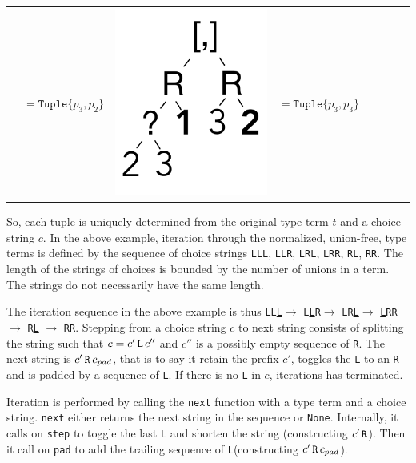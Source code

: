 \documentclass[a4paper,english]{lipics-v2019}
\newcommand{\xt}[1]{\texttt{#1}}
\renewcommand{\L}{{\tt L}\xspace}
\newcommand{\R}{{\tt R}\xspace}
\newcommand{\uL}{{\underline{\tt L}}\xspace}
\renewcommand{\c}[1]{\lstinline{#1}\xspace}
\newcommand{\tuple}[1]{\xt{Tuple\{}#1\xt{\}}}
\begin{document}
{\begin{tabular}{@{}l@{~}ll@{~}ll@{~}ll@{~}l}
\begin{minipage}{1.2cm}
\end{minipage} &  $ =   \tuple{p_3,p_2} $ 
&\begin{minipage}{1.2cm}\includegraphics[scale=.25]{figures/tree7.pdf} 
\end{minipage} &  $ =   \tuple{p_3,p_3} $ 
\end{tabular}}

\noindent 
So, each tuple is uniquely determined from the original type term $t$ and a
choice string $c$. In the above example, iteration through the normalized,
union-free, type terms is defined by the sequence of choice strings \L\L\L,
\L\L\R, \L\R\L, \L\R\R, \R\L, \R\R. The length of the strings of choices is
bounded by the number of unions in a term.  The strings do not necessarily
have the same length.


The iteration sequence in the above example is thus \L\L\uL $\rightarrow$
\L\uL\R $\rightarrow$ \L\R\uL $\rightarrow$ \uL\R\R $\rightarrow$ \R\uL
$\rightarrow$ \R\R. Stepping from a choice string $c$ to next string
consists of splitting the string such that $c = c' \,\L\,c''$ and $c''$ is a
possibly empty sequence of \R.  The next string is $c'\, \R \, c_{pad}$,
that is to say it retain the prefix $c'$, toggles the \L to an \R and is
padded by a sequence of \L.  If there is no \L in $c$, iterations has
terminated.

Iteration is performed by calling the \c{next} function with a type term and
a choice string. \c{next} either returns the next string in the sequence or
\c{None}. Internally, it calls on \c{step} to toggle the last \L and shorten
the string (constructing $c'\,\R$). Then it call on \c{pad} to add the
trailing sequence of \L (constructing $c'\,\R\,c_{pad}$).
\end{document}
